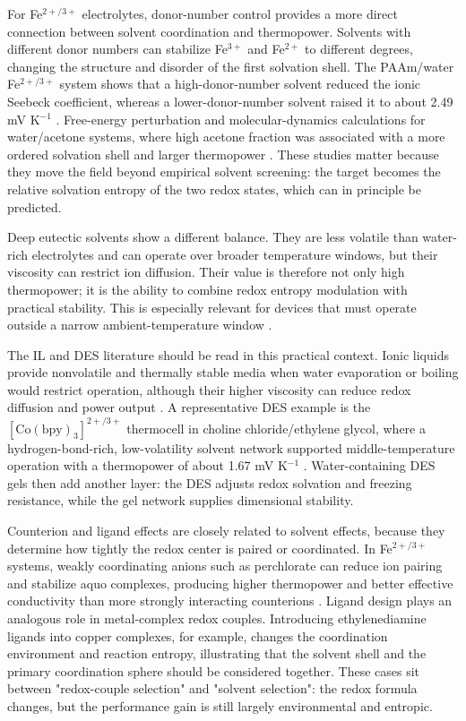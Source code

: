 For Fe$^{2+/3+}$ electrolytes, donor-number control provides a more direct
connection between solvent coordination and thermopower. Solvents with
different donor numbers can stabilize Fe$^{3+}$ and Fe$^{2+}$ to different
degrees, changing the structure and disorder of the first solvation shell. The
PAAm/water Fe$^{2+/3+}$ system shows that a
high-donor-number solvent reduced the ionic Seebeck coefficient, whereas a
lower-donor-number solvent raised it to about 2.49 mV K$^{-1}$
\citep{chen2023solvation}. Free-energy
perturbation and molecular-dynamics calculations for water/acetone systems,
where high acetone fraction was associated with a more ordered solvation shell
and larger thermopower \citep{chen2023solvation}. These studies matter because
they move the field beyond empirical solvent screening: the target becomes the
relative solvation entropy of the two redox states, which can in principle be
predicted.

Deep eutectic solvents show a different balance. They are less volatile than
water-rich electrolytes and can operate over broader temperature windows, but
their viscosity can restrict ion diffusion. Their value is therefore not only
high thermopower; it is the ability to combine redox entropy modulation with
practical stability. This is especially relevant for devices that must operate
outside a narrow ambient-temperature window \citep{antariksa2021deep}.

The IL and DES literature should be read in this practical context. Ionic
liquids provide nonvolatile and thermally stable media when water evaporation
or boiling would restrict operation, although their higher viscosity can reduce
redox diffusion and power output \citep{russo2019hydrogels}. A representative DES example is the
$[\mathrm{Co(bpy)}_3]^{2+/3+}$ thermocell in choline
chloride/ethylene glycol, where a hydrogen-bond-rich, low-volatility solvent
network supported middle-temperature operation with a thermopower of about
1.67 mV K$^{-1}$ \citep{antariksa2021deep}. Water-containing DES gels then add
another layer: the DES adjusts redox solvation and freezing resistance, while
the gel network supplies dimensional stability.

Counterion and ligand effects are closely related to solvent effects, because
they determine how tightly the redox center is paired or coordinated. In
Fe$^{2+/3+}$ systems, weakly coordinating anions such as perchlorate can reduce
ion pairing and stabilize aquo complexes, producing higher thermopower and
better effective conductivity than more strongly interacting counterions
\citep{duan2018aqueous}. Ligand design plays an analogous role in metal-complex
redox couples. Introducing ethylenediamine ligands into copper complexes, for
example, changes the coordination environment and reaction entropy, illustrating
that the solvent shell and the primary coordination sphere should be considered
together. These cases sit
between "redox-couple selection" and "solvent selection": the redox formula
changes, but the performance gain is still largely environmental and entropic.

